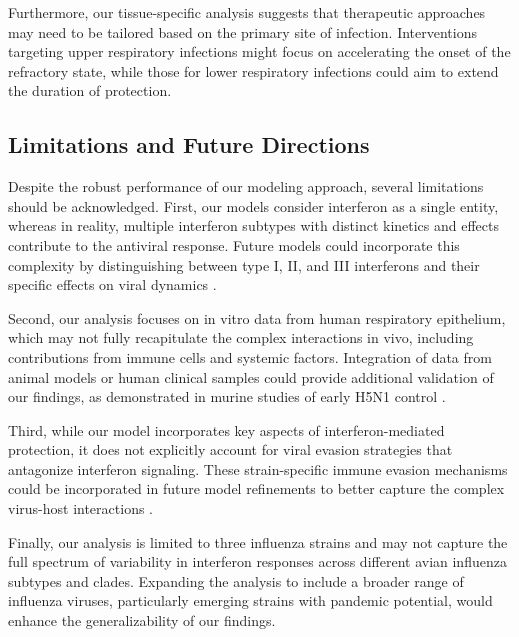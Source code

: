 \documentclass[12pt]{article}
\begin{document}
Furthermore, our tissue-specific analysis suggests that therapeutic approaches may need to be tailored based on the primary site of infection. Interventions targeting upper respiratory infections might focus on accelerating the onset of the refractory state, while those for lower respiratory infections could aim to extend the duration of protection.

\subsection{Limitations and Future Directions}
Despite the robust performance of our modeling approach, several limitations should be acknowledged. First, our models consider interferon as a single entity, whereas in reality, multiple interferon subtypes with distinct kinetics and effects contribute to the antiviral response. Future models could incorporate this complexity by distinguishing between type I, II, and III interferons and their specific effects on viral dynamics \cite{wenxin20}.

Second, our analysis focuses on in vitro data from human respiratory epithelium, which may not fully recapitulate the complex interactions in vivo, including contributions from immune cells and systemic factors. Integration of data from animal models or human clinical samples could provide additional validation of our findings, as demonstrated in murine studies of early H5N1 control \cite{szretter09}.

Third, while our model incorporates key aspects of interferon-mediated protection, it does not explicitly account for viral evasion strategies that antagonize interferon signaling. These strain-specific immune evasion mechanisms could be incorporated in future model refinements to better capture the complex virus-host interactions \cite{munozmoreno20}.

Finally, our analysis is limited to three influenza strains and may not capture the full spectrum of variability in interferon responses across different avian influenza subtypes and clades. Expanding the analysis to include a broader range of influenza viruses, particularly emerging strains with pandemic potential, would enhance the generalizability of our findings.
\end{document}
